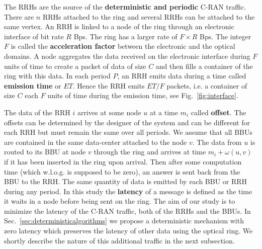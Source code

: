 \documentclass[10pt, conference, letterpaper]{IEEEtran}
\begin{document}
   The RRHs are the source of the {\bf deterministic and periodic} C-RAN traffic.
   There are $n$ RRHs attached to the ring and several RRHs can be attached to the same vertex. An RRH is linked to a node of the ring through an electronic interface of bit rate $R$ Bps.
   The ring has a larger rate of $F\times R$ Bps. The integer $F$ is called the {\bf acceleration factor} between the electronic and the optical domains. A node aggregates the data received on the electronic interface during $F$ units of time to create a packet of data of size $C$ and then fills a container of the ring with this data. 
  In each period $P$, an RRH emits data during a time called \textbf{emission time} or $ET$. Hence the RRH emits $ET / F$ packets, i.e. a container of size $C$ each $F$ units of time during the emission time, see Fig.~\ref{fig:interface}.
   
   The data of the RRH $i$ arrives at some node $u$ at a time $m_i$ called {\bf offset}. The offsets can be determined 
   by the designer of the system and can be different for each RRH but must remain the same over all periods. We assume that all BBUs are contained in the same data-center attached to the node $v$. The data from $u$ is routed to its BBU at node $v$ through the ring and arrives at time $m_i + \omega(u,v)$ if it has been inserted in the ring upon arrival. Then after some computation time (which w.l.o.g. is supposed to be zero), an answer is sent back from the BBU to the RRH. The same quantity of data is emitted by each BBU or RRH during any period.
   In this study the {\bf latency} of a message is defined as the time it waits in a node before being sent on the ring.
   The aim of our study is to minimize the latency of the C-RAN traffic, both of the RRHs and the BBUs. 
   In Sec.~\ref{sec:deterministicalgorithms} we propose a deterministic mechanism with zero latency which preserves the latency of other data using the optical ring. We shortly describe the nature of this additional traffic in the next subsection.
   
\end{document}

